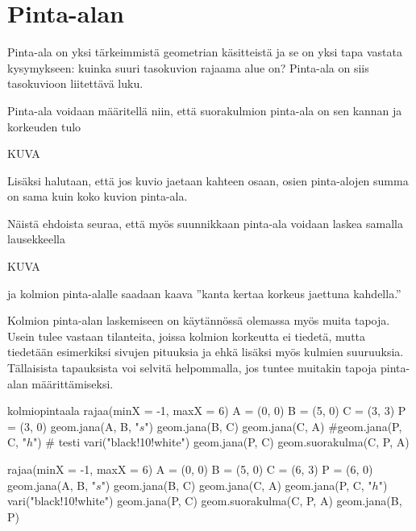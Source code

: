 \section{Pinta-alan}

Pinta-ala on yksi tärkeimmistä geometrian käsitteistä ja se on yksi tapa vastata kysymykseen: kuinka suuri tasokuvion rajaama alue on? Pinta-ala on siis tasokuvioon liitettävä luku.

Pinta-ala voidaan määritellä niin, että suorakulmion pinta-ala on sen kannan ja korkeuden tulo

KUVA

Lisäksi halutaan, että jos kuvio jaetaan kahteen osaan, osien pinta-alojen summa on sama kuin koko kuvion pinta-ala.

Näistä ehdoista seuraa, että myös suunnikkaan pinta-ala voidaan laskea samalla lausekkeella

KUVA

ja kolmion pinta-alalle saadaan kaava ''kanta kertaa korkeus jaettuna kahdella.''

Kolmion pinta-alan laskemiseen on käytännössä olemassa myös muita tapoja. Usein tulee vastaan tilanteita, joissa kolmion korkeutta ei tiedetä, mutta tiedetään esimerkiksi sivujen pituuksia ja ehkä lisäksi myös kulmien suuruuksia. Tällaisista tapauksista voi selvitä helpommalla, jos tuntee muitakin tapoja pinta-alan määrittämiseksi.

\begin{luoKuva}{kolmiopintaala}
	rajaa(minX = -1, maxX = 6)
	A = (0, 0)
	B = (5, 0)
	C = (3, 3)
	P = (3, 0)
	geom.jana(A, B, "$s$")
	geom.jana(B, C)
	geom.jana(C, A)
	#geom.jana(P, C, "$h$") # testi
	vari("black!10!white")
	geom.jana(P, C) 
	geom.suorakulma(C, P, A)
\end{luoKuva}


\begin{center}
\begin{kuva}
	rajaa(minX = -1, maxX = 6)
	A = (0, 0)
	B = (5, 0)
	C = (6, 3)
	P = (6, 0)
	geom.jana(A, B, "$s$")
	geom.jana(B, C)
	geom.jana(C, A)
	geom.jana(P, C, "$h$")
	vari("black!10!white")
	geom.jana(P, C)
	geom.suorakulma(C, P, A)
	geom.jana(B, P)
\end{kuva}
\end{center}



